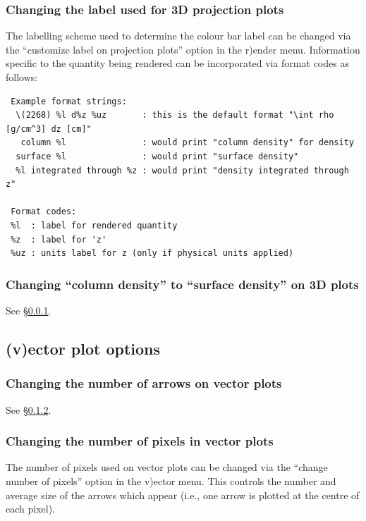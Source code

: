 \documentclass[a4paper,10pt]{article}
\begin{document}
\subsubsection{ Changing the label used for 3D projection plots}
\label{sec:setprojlabel}
The labelling scheme used to determine the colour bar label can be changed via the ``customize label on projection plots'' option in the r)ender menu. Information specific to the quantity being rendered can be incorporated via format codes as follows:
\begin{verbatim}
 Example format strings: 
  \(2268) %l d%z %uz       : this is the default format "\int rho [g/cm^3] dz [cm]"
   column %l               : would print "column density" for density
  surface %l               : would print "surface density"
  %l integrated through %z : would print "density integrated through z"

 Format codes: 
 %l  : label for rendered quantity 
 %z  : label for 'z' 
 %uz : units label for z (only if physical units applied)
\end{verbatim}


\subsubsection{ Changing ``column density'' to ``surface density'' on 3D plots}
See \S\ref{sec:setprojlabel}.

\subsection{(v)ector plot options}
\label{sec:vectorplots}

\subsubsection{ Changing the number of arrows on vector plots}
 See \S\ref{sec:vecpix}.

\subsubsection{ Changing the number of pixels in vector plots}
\label{sec:vecpix}
 The number of pixels used on vector plots can be changed via the ``change number of pixels'' option in the v)ector menu. This controls the number and average size of the arrows which appear (i.e., one arrow is plotted at the centre of each pixel).
\end{document}
